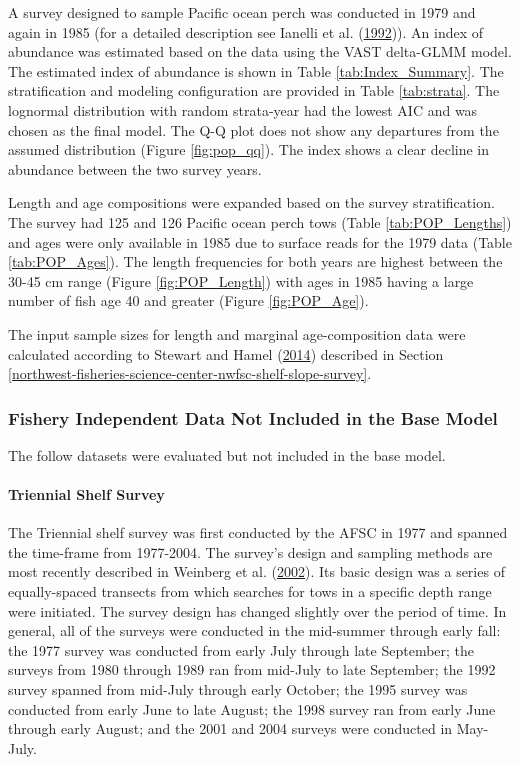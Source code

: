\documentclass[12pt,]{article}
\let\oldparagraph\paragraph
\renewcommand{\paragraph}[1]{\oldparagraph{#1}\mbox{}}
\begin{document}
A survey designed to sample Pacific ocean perch was conducted in 1979
and again in 1985 (for a detailed description see Ianelli et al.
(\protect\hyperlink{ref-ianelli_status_1992}{1992})). An index of
abundance was estimated based on the data using the VAST delta-GLMM
model. The estimated index of abundance is shown in Table
\ref{tab:Index_Summary}. The stratification and modeling configuration
are provided in Table \ref{tab:strata}. The lognormal distribution with
random strata-year had the lowest AIC and was chosen as the final model.
The Q-Q plot does not show any departures from the assumed distribution
(Figure \ref{fig:pop_qq}). The index shows a clear decline in abundance
between the two survey years.

Length and age compositions were expanded based on the survey
stratification. The survey had 125 and 126 Pacific ocean perch tows
(Table \ref{tab:POP_Lengths}) and ages were only available in 1985 due
to surface reads for the 1979 data (Table \ref{tab:POP_Ages}). The
length frequencies for both years are highest between the 30-45 cm range
(Figure \ref{fig:POP_Length}) with ages in 1985 having a large number of
fish age 40 and greater (Figure \ref{fig:POP_Age}).

The input sample sizes for length and marginal age-composition data were
calculated according to Stewart and Hamel
(\protect\hyperlink{ref-stewart_bootstrapping_2014}{2014}) described in
Section
\ref{northwest-fisheries-science-center-nwfsc-shelf-slope-survey}.

\subsubsection{Fishery Independent Data Not Included in the Base
Model}\label{fishery-independent-data-not-included-in-the-base-model}

The follow datasets were evaluated but not included in the base model.

\paragraph{Triennial Shelf Survey}\label{triennial-shelf-survey}

The Triennial shelf survey was first conducted by the AFSC in 1977 and
spanned the time-frame from 1977-2004. The survey's design and sampling
methods are most recently described in Weinberg et al.
(\protect\hyperlink{ref-weinberg_estimation_2002}{2002}). Its basic
design was a series of equally-spaced transects from which searches for
tows in a specific depth range were initiated. The survey design has
changed slightly over the period of time. In general, all of the surveys
were conducted in the mid-summer through early fall: the 1977 survey was
conducted from early July through late September; the surveys from 1980
through 1989 ran from mid-July to late September; the 1992 survey
spanned from mid-July through early October; the 1995 survey was
conducted from early June to late August; the 1998 survey ran from early
June through early August; and the 2001 and 2004 surveys were conducted
in May-July.
\end{document}
